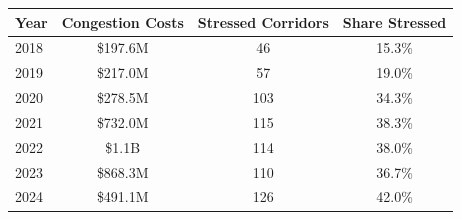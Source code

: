 \begin{table}[!htbp]
\centering
\small
\setlength{\tabcolsep}{6pt}
\renewcommand{\arraystretch}{1.00}
\begin{tabular}{@{}lccc@{}}
\toprule
Year & Congestion Costs & Stressed Corridors & Share Stressed \\
\midrule
2018 & \$197.6M & 46 & 15.3\% \\
2019 & \$217.0M & 57 & 19.0\% \\
2020 & \$278.5M & 103 & 34.3\% \\
2021 & \$732.0M & 115 & 38.3\% \\
2022 & \$1.1B & 114 & 38.0\% \\
2023 & \$868.3M & 110 & 36.7\% \\
2024 & \$491.1M & 126 & 42.0\% \\
\bottomrule
\end{tabular}
\end{table}
